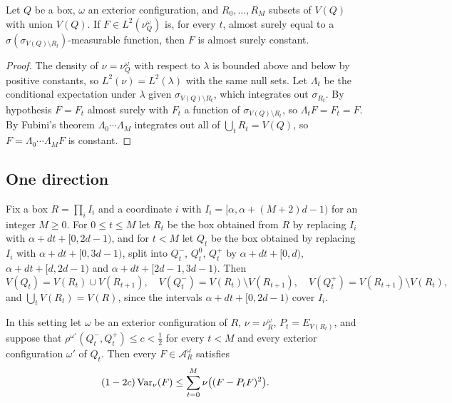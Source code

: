 \begin{lemma}\label{lem:constant}
Let $Q$ be a box, $\omega$ an exterior configuration, and $R_0,\dots,R_M$
subsets of $V(Q)$ with union $V(Q)$. If $F\in L^2(\nu^\omega_Q)$ is, for every
$t$, almost surely equal to a $\sigma(\sigma_{V(Q)\setminus
R_t})$-measurable function, then $F$ is almost surely constant.
\end{lemma}

\begin{proof}
The density of $\nu=\nu^\omega_Q$ with respect to $\lambda$ is bounded above
and below by positive constants, so $L^2(\nu)=L^2(\lambda)$ with the same
null sets. Let $\Lambda_t$ be the conditional expectation under $\lambda$
given $\sigma_{V(Q)\setminus R_t}$, which integrates out $\sigma_{R_t}$. By
hypothesis $F=F_t$ almost surely with $F_t$ a function of
$\sigma_{V(Q)\setminus R_t}$, so $\Lambda_tF=F_t=F$. By Fubini's theorem
$\Lambda_0\cdots\Lambda_M$ integrates out all of $\bigcup_tR_t=V(Q)$, so
$F=\Lambda_0\cdots\Lambda_MF$ is constant.
\end{proof}

\subsection{One direction}

Fix a box $R=\prod_iI_i$ and a coordinate $i$ with $I_i=[\alpha,\alpha+
(M+2)d-1)$ for an integer $M\ge0$. For $0\le t\le M$ let $R_t$ be the box
obtained from $R$ by replacing $I_i$ with $\alpha+dt+[0,2d-1)$, and for
$t<M$ let $Q_t$ be the box obtained by replacing $I_i$ with $\alpha+dt+
[0,3d-1)$, split into $Q_t^-$, $Q_t^0$, $Q_t^+$ by $\alpha+dt+[0,d)$,
$\alpha+dt+[d,2d-1)$ and $\alpha+dt+[2d-1,3d-1)$. Then
\begin{equation}\label{eq:slabs}
V(Q_t)=V(R_t)\cup V(R_{t+1}),\quad V(Q_t^-)=V(R_t)\setminus V(R_{t+1}),
\quad V(Q_t^+)=V(R_{t+1})\setminus V(R_t),
\end{equation}
and $\bigcup_tV(R_t)=V(R)$, since the intervals $\alpha+dt+[0,2d-1)$ cover
$I_i$.

\begin{proposition}\label{prop:slab}
In this setting let $\omega$ be an exterior configuration of $R$,
$\nu=\nu^\omega_R$, $P_t=E_{V(R_t)}$, and suppose that $\rho^{\omega'}(Q^-_t,
Q^+_t)\le c<\frac12$ for every $t<M$ and every exterior configuration
$\omega'$ of $Q_t$. Then every $F\in\mathcal A^\omega_R$ satisfies
\[
(1-2c)\operatorname{Var}_\nu(F)\le\sum_{t=0}^M\nu\bigl((F-P_tF)^2\bigr).
\]
\end{proposition}

